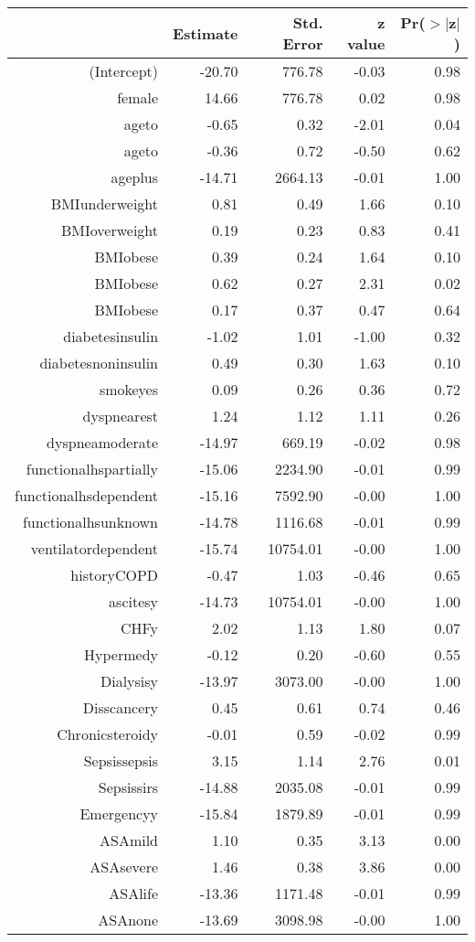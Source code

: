 \bigskip\bigskip
\centering
\begin{tabular}{rrrrr}
  \hline
 & Estimate & Std. Error & z value & Pr($>$$|$z$|$) \\ 
  \hline
(Intercept) & -20.70 & 776.78 & -0.03 & 0.98 \\ 
  female & 14.66 & 776.78 & 0.02 & 0.98 \\ 
  age\-65\-to\-74 & -0.65 & 0.32 & -2.01 & 0.04 \\ 
  age\-75\-to\-84 & -0.36 & 0.72 & -0.50 & 0.62 \\ 
  age\-85\-plus & -14.71 & 2664.13 & -0.01 & 1.00 \\ 
  BMI\-underweight & 0.81 & 0.49 & 1.66 & 0.10 \\ 
  BMI\-overweight & 0.19 & 0.23 & 0.83 & 0.41 \\ 
  BMI\-obese\-1 & 0.39 & 0.24 & 1.64 & 0.10 \\ 
  BMI\-obese\-2 & 0.62 & 0.27 & 2.31 & 0.02 \\ 
  BMI\-obese\-3 & 0.17 & 0.37 & 0.47 & 0.64 \\ 
  diabetes\-insulin & -1.02 & 1.01 & -1.00 & 0.32 \\ 
  diabetes\-noninsulin & 0.49 & 0.30 & 1.63 & 0.10 \\ 
  smoke\-yes & 0.09 & 0.26 & 0.36 & 0.72 \\ 
  dyspnea\-rest & 1.24 & 1.12 & 1.11 & 0.26 \\ 
  dyspnea\-moderate & -14.97 & 669.19 & -0.02 & 0.98 \\ 
  functional\-hs\-partially & -15.06 & 2234.90 & -0.01 & 0.99 \\ 
  functional\-hs\-dependent & -15.16 & 7592.90 & -0.00 & 1.00 \\ 
  functional\-hs\-unknown & -14.78 & 1116.68 & -0.01 & 0.99 \\ 
  ventilator\-dependent & -15.74 & 10754.01 & -0.00 & 1.00 \\ 
  history\-COPD & -0.47 & 1.03 & -0.46 & 0.65 \\ 
  ascites\-y & -14.73 & 10754.01 & -0.00 & 1.00 \\ 
  CHF\-y & 2.02 & 1.13 & 1.80 & 0.07 \\ 
  Hyper\-med\-y & -0.12 & 0.20 & -0.60 & 0.55 \\ 
  Dialysis\-y & -13.97 & 3073.00 & -0.00 & 1.00 \\ 
  Diss\-cancer\-y & 0.45 & 0.61 & 0.74 & 0.46 \\ 
  Chronic\-steroid\-y & -0.01 & 0.59 & -0.02 & 0.99 \\ 
  Sepsis\-sepsis & 3.15 & 1.14 & 2.76 & 0.01 \\ 
  Sepsis\-sirs & -14.88 & 2035.08 & -0.01 & 0.99 \\ 
  Emergency\-y & -15.84 & 1879.89 & -0.01 & 0.99 \\ 
  ASA\-mild & 1.10 & 0.35 & 3.13 & 0.00 \\ 
  ASA\-severe & 1.46 & 0.38 & 3.86 & 0.00 \\ 
  ASA\-life & -13.36 & 1171.48 & -0.01 & 0.99 \\ 
  ASA\-none & -13.69 & 3098.98 & -0.00 & 1.00 \\ 
   \hline
\end{tabular}
